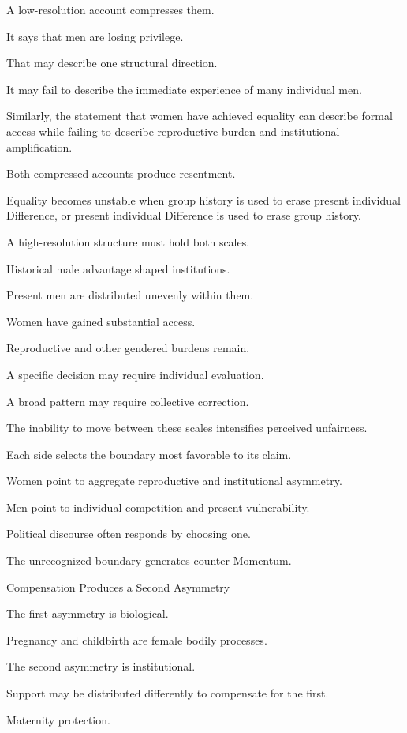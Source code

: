 A low-resolution account compresses them.

It says that men are losing privilege.

That may describe one structural direction.

It may fail to describe the immediate experience of many individual men.

Similarly, the statement that women have achieved equality can describe formal access while failing to describe reproductive burden and institutional amplification.

Both compressed accounts produce resentment.

Equality becomes unstable when group history is used to erase present individual Difference, or present individual Difference is used to erase group history.

A high-resolution structure must hold both scales.

Historical male advantage shaped institutions.

Present men are distributed unevenly within them.

Women have gained substantial access.

Reproductive and other gendered burdens remain.

A specific decision may require individual evaluation.

A broad pattern may require collective correction.

The inability to move between these scales intensifies perceived unfairness.

Each side selects the boundary most favorable to its claim.

Women point to aggregate reproductive and institutional asymmetry.

Men point to individual competition and present vulnerability.

Political discourse often responds by choosing one.

The unrecognized boundary generates counter-Momentum.

Compensation Produces a Second Asymmetry

The first asymmetry is biological.

Pregnancy and childbirth are female bodily processes.

The second asymmetry is institutional.

Support may be distributed differently to compensate for the first.

Maternity protection.

